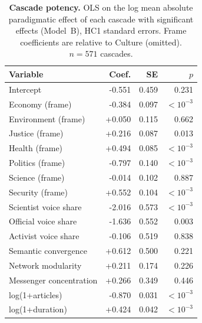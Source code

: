 \begin{table}[H]
\centering
\renewcommand{\arraystretch}{1.15}
\caption{\textbf{Cascade potency.} OLS on the log mean absolute
paradigmatic effect of each cascade with significant effects
(Model~B), HC1 standard errors. Frame coefficients are relative to
Culture (omitted). $n = 571$ cascades.}
\label{tab:si_cascade_potency}
\vspace{0.3em}
\small
\begin{tabular}{@{}l r r r@{}}
\toprule
Variable & Coef. & SE & $p$ \\
\midrule
Intercept & -0.551 & 0.459 & 0.231 \\
Economy (frame) & -0.384 & 0.097 & $<10^{-3}$ \\
Environment (frame) & +0.050 & 0.115 & 0.662 \\
Justice (frame) & +0.216 & 0.087 & 0.013 \\
Health (frame) & +0.494 & 0.085 & $<10^{-3}$ \\
Politics (frame) & -0.797 & 0.140 & $<10^{-3}$ \\
Science (frame) & -0.014 & 0.102 & 0.887 \\
Security (frame) & +0.552 & 0.104 & $<10^{-3}$ \\
Scientist voice share & -2.016 & 0.573 & $<10^{-3}$ \\
Official voice share & -1.636 & 0.552 & 0.003 \\
Activist voice share & -0.106 & 0.519 & 0.838 \\
Semantic convergence & +0.612 & 0.500 & 0.221 \\
Network modularity & +0.211 & 0.174 & 0.226 \\
Messenger concentration & +0.266 & 0.349 & 0.446 \\
log(1+articles) & -0.870 & 0.031 & $<10^{-3}$ \\
log(1+duration) & +0.424 & 0.042 & $<10^{-3}$ \\
\bottomrule
\end{tabular}
\end{table}

